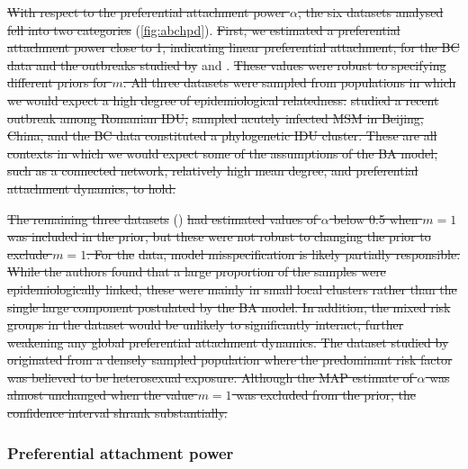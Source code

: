 {\color{red}\sout{With respect to the preferential attachment power $\alpha$,
the six datasets analysed fell into two categories} (\cref{fig:abchpd}).
\sout{First, we estimated a preferential attachment power close to 1,
indicating linear preferential attachment, for the BC data and the outbreaks
studied by} \textcite{niculescu2015recent} and \textcite{wang2015targeting}.
\sout{These values were robust to specifying different priors for $m$. All three
datasets were sampled from populations in which we would expect a high degree
of epidemiological relatedness:} \textcite{niculescu2015recent} \sout{studied a
recent outbreak among Romanian \gls{IDU},} \citeauthor{wang2015targeting}
\sout{sampled acutely infected MSM in Beijing, China, and the BC data
constituted a phylogenetic \gls{IDU} cluster. These are all contexts in which
we would expect some of the assumptions of the BA model, such as a connected
network, relatively high mean degree, and preferential attachment dynamics, to
hold.}

\sout{The remaining three datasets} (\textcite{cuevas2009hiv,
novitsky2014impact, li2015hiv}) \sout{had estimated values of $\alpha$ below
0.5 when $m = 1$ was included in the prior, but these were not robust to
changing the prior to exclude $m = 1$. For the} \citeauthor{cuevas2009hiv} 
\sout{data, model misspecification is likely partially responsible. While the
authors found that a large proportion of the samples were epidemiologically
linked, these were mainly in small local clusters rather than the single large
component postulated by the BA model. In addition, the mixed risk groups in the
dataset would be unlikely to significantly interact, further weakening any
global preferential attachment dynamics. The dataset studied by}
\textcite{novitsky2014impact} \sout{originated from a densely sampled
population where the predominant risk factor was believed to be heterosexual
exposure. Although the MAP estimate of $\alpha$ was almost unchanged when the
value $m = 1$ was excluded from the prior, the confidence interval shrank
substantially.}}



\subsubsection{Preferential attachment power}

